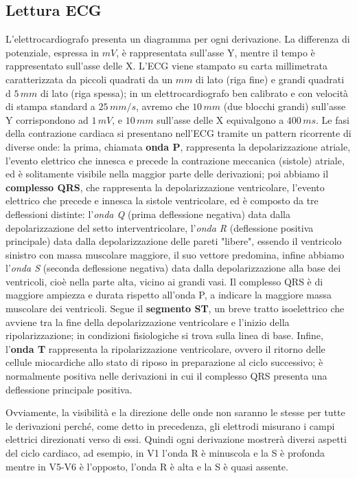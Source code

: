 \subsection{Lettura ECG}
L'elettrocardiografo presenta un diagramma per ogni derivazione. La differenza di potenziale, espressa in $mV$, è rappresentata sull'asse Y, mentre il tempo è rappresentato sull'asse delle X. L'ECG viene stampato su carta millimetrata caratterizzata da piccoli quadrati da un $mm$ di lato (riga fine) e grandi quadrati d $5\,mm$ di lato (riga spessa); in un elettrocardiografo ben calibrato e con velocità di stampa standard a $25\,mm/s$, avremo che $10\,mm$ (due blocchi grandi) sull'asse Y corrispondono ad $1\,mV$, e $10\,mm$ sull'asse delle X equivalgono a $400\,ms$.
 Le fasi della contrazione cardiaca si presentano nell'ECG tramite un pattern ricorrente di diverse onde: la prima, chiamata \textbf{onda P}, rappresenta la depolarizzazione atriale, l’evento elettrico che innesca e precede la contrazione meccanica (sistole) atriale, ed è solitamente visibile nella maggior parte delle derivazioni; poi abbiamo il \textbf{complesso QRS}, che rappresenta la depolarizzazione ventricolare, l’evento elettrico che precede e innesca la sistole ventricolare, ed è composto da tre deflessioni distinte: l'\textit{onda Q} (prima deflessione negativa) data dalla depolarizzazione del setto interventricolare, l'\textit{onda R} (deflessione positiva principale) data dalla depolarizzazione delle pareti "libere", essendo il ventricolo sinistro con massa muscolare maggiore, il suo vettore predomina, infine abbiamo l'\textit{onda S} (seconda deflessione negativa) data dalla depolarizzazione alla base dei ventricoli, cioè nella parte alta, vicino ai grandi vasi. Il complesso QRS è di maggiore ampiezza e durata rispetto all'onda P, a indicare la maggiore massa muscolare dei ventricoli. Segue il \textbf{segmento ST}, un breve tratto isoelettrico che avviene tra la fine della depolarizzazione ventricolare e l'inizio della ripolarizzazione; in condizioni fisiologiche si trova sulla linea di base. Infine, l'\textbf{onda T} rappresenta la ripolarizzazione ventricolare, ovvero il ritorno delle cellule miocardiche allo stato di riposo in preparazione al ciclo successivo; è normalmente positiva nelle derivazioni in cui il complesso QRS presenta una deflessione principale positiva.

Ovviamente, la visibilità e la direzione delle onde non saranno le stesse per tutte le derivazioni perché, come detto in precedenza, gli elettrodi misurano i campi elettrici direzionati verso di essi. Quindi ogni derivazione mostrerà diversi aspetti del ciclo cardiaco, ad esempio, in V1 l'onda R è minuscola e la S è profonda mentre in V5-V6 è l'opposto, l'onda R è alta e la S è quasi assente.

